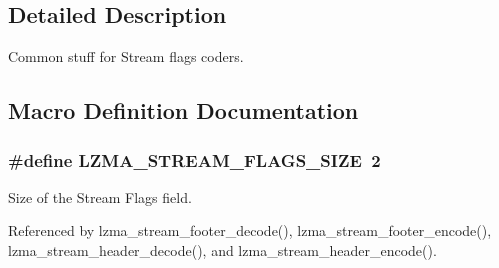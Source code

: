 \subsection{Detailed Description}
Common stuff for Stream flags coders. 

\subsection{Macro Definition Documentation}
\subsubsection[{L\-Z\-M\-A\-\_\-\-S\-T\-R\-E\-A\-M\-\_\-\-F\-L\-A\-G\-S\-\_\-\-S\-I\-Z\-E}]{\setlength{\rightskip}{0pt plus 5cm}\#define L\-Z\-M\-A\-\_\-\-S\-T\-R\-E\-A\-M\-\_\-\-F\-L\-A\-G\-S\-\_\-\-S\-I\-Z\-E~2}\label{stream__flags__common_8h_ab858cab2e3df13cb9bdd02d0d436fd61}


Size of the Stream Flags field. 



Referenced by lzma\-\_\-stream\-\_\-footer\-\_\-decode(), lzma\-\_\-stream\-\_\-footer\-\_\-encode(), lzma\-\_\-stream\-\_\-header\-\_\-decode(), and lzma\-\_\-stream\-\_\-header\-\_\-encode().


